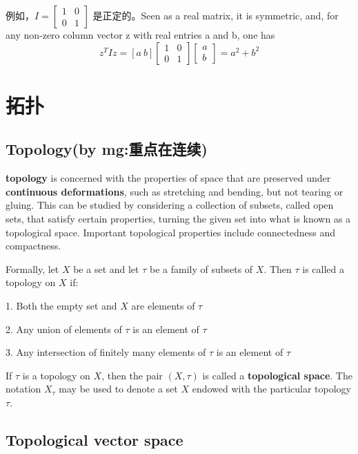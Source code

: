 例如，$I=\begin{bmatrix} 1 & 0 \\ 0 & 1\end{bmatrix}$ 是正定的。Seen as a real matrix, it is symmetric, and, for any non-zero column vector z with real entries a and b, one has
\[ z^TIz=[a \ b] \begin{bmatrix} 1 & 0 \\ 0 & 1\end{bmatrix} \begin{bmatrix} a \\ b\end{bmatrix} =a^2+b^2 \]



\section{拓扑}
\subsection{Topology(by mg:重点在连续)}
\cite{_topology_????}

\textbf{topology} is concerned with the properties of space that are preserved under \textbf{continuous deformations}, such as stretching and bending, but not tearing or gluing. This can be studied by considering a collection of subsets, called open sets, that satisfy certain properties, turning the given set into what is known as a topological space. Important topological properties include connectedness and compactness.

Formally, let $X$ be a set and let $\tau$ be a family of subsets of $X$. Then $\tau$ is called a topology on $X$ if:\par
1. Both the empty set and $X$ are elements of $\tau$ \par
2. Any union of elements of $\tau$ is an element of $\tau$ \par
3. Any intersection of finitely many elements of $\tau$ is an element of $\tau$\par
If $\tau$ is a topology on $X$, then the pair $(X, \tau)$ is called a \textbf{topological space}. The notation $X_\tau$ may be used to denote a set $X$ endowed with the particular topology $\tau$.

\subsection{Topological vector space}
\cite{_topological_????}

